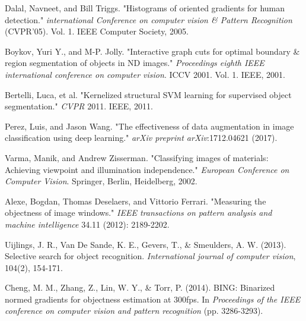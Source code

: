\documentclass[12pt]{report}
\begin{document}
\begin{thebibliography}{9}
			Dalal, Navneet, and Bill Triggs. "Histograms of oriented gradients for human detection." \textit{international Conference on computer vision \& Pattern Recognition} (CVPR'05). Vol. 1. IEEE Computer Society, 2005.
																																																																																																
			Boykov, Yuri Y., and M-P. Jolly. "Interactive graph cuts for optimal boundary \& region segmentation of objects in ND images." \textit{Proceedings eighth IEEE international conference on computer vision}. ICCV 2001. Vol. 1. IEEE, 2001.
																																																																																															
			Bertelli, Luca, et al. "Kernelized structural SVM learning for supervised object segmentation." \textit{CVPR} 2011. IEEE, 2011.
																																																		
			Perez, Luis, and Jason Wang. "The effectiveness of data augmentation in image classification using deep learning." \textit{arXiv preprint arXiv}:1712.04621 (2017).
																																																																																										
			Varma, Manik, and Andrew Zisserman. "Classifying images of materials: Achieving viewpoint and illumination independence." \textit{European Conference on Computer Vision}. Springer, Berlin, Heidelberg, 2002.	
																																																																																													
			Alexe, Bogdan, Thomas Deselaers, and Vittorio Ferrari. "Measuring the objectness of image windows." \textit{IEEE transactions on pattern analysis and machine intelligence} 34.11 (2012): 2189-2202.
																																																																																										
			Uijlings, J. R., Van De Sande, K. E., Gevers, T., \& Smeulders, A. W. (2013). Selective search for object recognition. \textit{International journal of computer vision}, 104(2), 154-171.
																																																																																										
			Cheng, M. M., Zhang, Z., Lin, W. Y., \& Torr, P. (2014). BING: Binarized normed gradients for objectness estimation at 300fps. In \textit{Proceedings of the IEEE conference on computer vision and pattern recognition} (pp. 3286-3293).
																																																																																										

\end{thebibliography}
\end{document}
